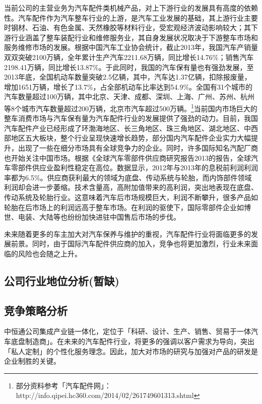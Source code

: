 当前公司的主营业务为汽车配件类机械产品，对上下游行业的发展具有高度的依赖性。汽车配件作为汽车整车行业的上游，是汽车工业发展的基础，其上游行业主要时钢材、石油、有色金属、天然橡胶等材料行业，受宏观经济波动影响较大；其下游行业涵盖了整车装配行业和维修服务业，其自身发展状况取决于下游整车市场和服务维修市场的发展。根据中国汽车工业协会统计，截止2013年，我国汽车产销量双双突破2100万辆，全年累计生产汽车2211.68万辆，同比增长14.76\%；销售汽车2198.41万辆，同比增长13.87\%。于此同时，我国的汽车保有量也有强劲发展，至2013年底，全国机动车数量突破2.5亿辆，其中，汽车达1.37亿辆，扣除报废量，增加1651万辆，增长了13.7\%，占全部机动车比率达到54.9\%。全国有31个城市的汽车数量超过100万辆，其中北京、天津、成都、深圳、上海、广州、苏州、杭州等8个城市汽车数量超过200万辆，北京市汽车超过500万辆。\footnote{部分资料参考「汽车配件网」：http://info.qipei.hc360.com/2014/02/261749601313.shtml}当前国内市场巨大的整车消费市场与汽车保有量为汽车配件行业的发展提供了强劲的动力。目前，我国汽车配件产业已经形成了环渤海地区、长三角地区、珠三角地区、湖北地区、中西部地区五大板块，整个行业呈现快速增长趋势，部分国内汽车配件企业实力大幅提升，出现了一些在细分市场具有全球竞争力的企业。同时，许多国际知名汽配厂商也开始关注中国市场。根据《全球汽车零部件供应商研究报告2013的报告，全球汽车零部件供应业盈利性稳定在高位。数据显示，2012年与2013年的息税前利润利润率都为6.5\%。供应商获利最大的领域为底盘、传动系统与轮胎，而内饰部件领域利润却会进一步萎缩。技术含量高，高附加值带来的高利润，突出地表现在底盘、传动系统及轮胎行业。这意味着汽车后市场规模巨大，利润不断攀升，很多产品如轮胎在后市场上的利润远高于整车市场。在利润的驱使下，国际零部件企业如博世、电装、大陆等也纷纷加快进驻中国售后市场的步伐。

未来随着更多的车主加大对汽车保养与维护的重视，汽车配件行业将面临更多的发展前景。同时，由于国际汽车配件供应商的加入，竞争也将更加激烈，行业未来面临的风险也会随之上升。

\subsection{公司行业地位分析(暂缺)}{}

\subsection{竞争策略分析}{}
中恒通公司集成产业链一体化，定位于「科研、设计、生产、销售、贸易于一体汽车底盘制造商」。在未来的汽车配件行业，将更多的强调以客户需求为导向，突出「私人定制」的个性化服务理念。因此，加大对市场的研究与加强对产品的研发是企业制胜的关键。


